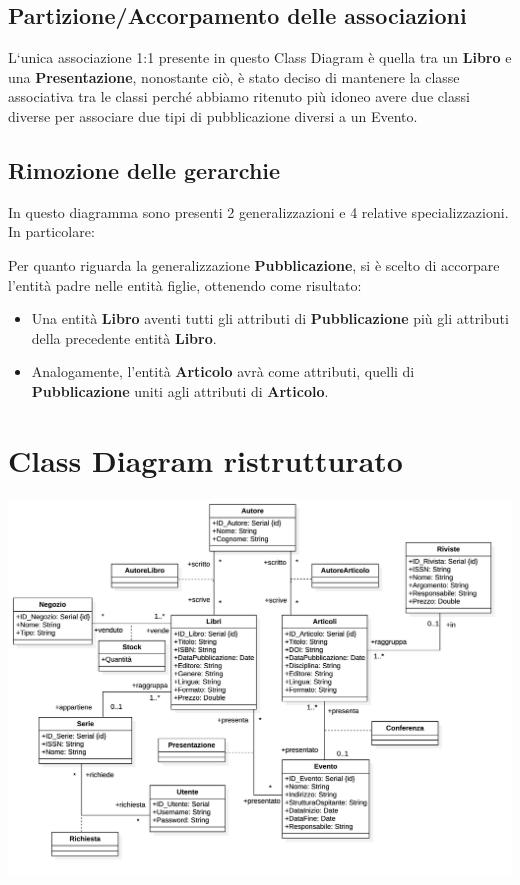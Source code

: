         \subsection{Partizione/Accorpamento delle associazioni}
        L`unica associazione 1:1 presente in questo Class Diagram \`e quella tra un \textbf{Libro} e una \textbf{Presentazione},
        nonostante ci\`o, \`e stato deciso di mantenere la classe associativa tra le classi perch\'e abbiamo ritenuto pi\`u idoneo
        avere due classi diverse per associare due tipi di pubblicazione diversi a un Evento.

            
        \subsection{Rimozione delle gerarchie}
            In questo diagramma sono presenti 2 generalizzazioni e 4 relative specializzazioni.
            In particolare:

            Per quanto riguarda la generalizzazione \textbf{Pubblicazione}, si \`e scelto di accorpare l'entit\`a padre
            nelle entit\`a figlie, ottenendo come risultato:
            \begin{itemize}
                  \item Una entit\`a \textbf{Libro} aventi tutti gli attributi di \textbf{Pubblicazione} pi\`u
                        gli attributi della precedente entit\`a \textbf{Libro}.
                  \item Analogamente, l'entit\`a \textbf{Articolo} avr\`a come attributi, quelli di \textbf{Pubblicazione}
                        uniti agli attributi di \textbf{Articolo}.
            \end{itemize}
    
    \section{Class Diagram ristrutturato}
    \includegraphics[scale=0.19]{Immagini/SchemaRistrutturato.png}
        \pagebreak
